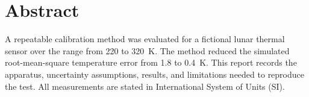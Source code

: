 \chapter*{Abstract}
A repeatable calibration method was evaluated for a fictional lunar thermal
sensor over the range from 220 to 320~K. The method reduced the simulated
root-mean-square temperature error from 1.8 to 0.4~K. This report records the
apparatus, uncertainty assumptions, results, and limitations needed to reproduce
the test. All measurements are stated in International System of Units (SI).

